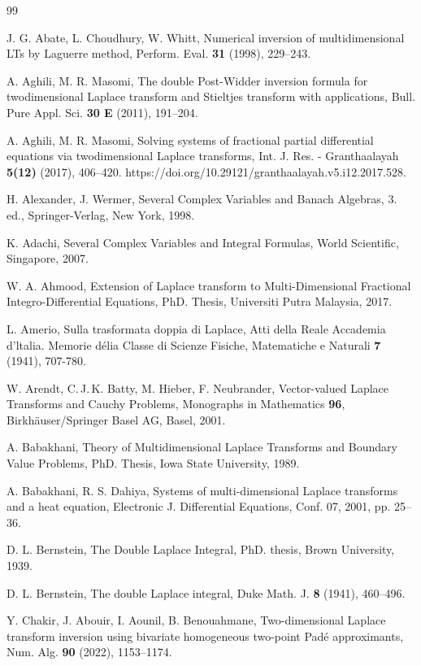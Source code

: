 \documentclass{amsart}
\theoremstyle{definition}
\theoremstyle{remark}
\numberwithin{equation}{section}
\begin{document}
\begin{thebibliography}{99}

 J.
G. Abate, L. Choudhury, W. Whitt, 
Numerical inversion of multidimensional LTs by Laguerre
method,
Perform. Eval. {\bf 31} (1998), 229--243.%

A. Aghili, M. R. Masomi,
The double Post-Widder inversion formula for twodimensional Laplace transform and Stieltjes transform with applications,
Bull. Pure Appl. Sci.
{\bf 30 E} (2011), 191--204.

A. Aghili, M. R. Masomi,
Solving systems of fractional partial differential equations via twodimensional Laplace transforms,
Int. J. Res. - Granthaalayah {\bf 5(12)} (2017), 406--420. https://doi.org/10.29121/granthaalayah.v5.i12.2017.528.

H. Alexander, J. Wermer,
Several Complex Variables and Banach Algebras, 3. ed.,
Springer-Verlag, New York, 1998.

K. Adachi,
Several Complex
Variables and
Integral Formulas,
World Scientific, Singapore, 2007.

W. A. Ahmood,
Extension of Laplace transform to Multi-Dimensional Fractional Integro-Differential Equations,
PhD. Thesis,
Universiti Putra Malaysia, 2017.

L. Amerio, 
Sulla trasformata doppia di Laplace, 
Atti della Reale Accademia d'ltalia.
Memorie délia Classe di Scienze Fisiche, Matematiche e Naturali {\bf 7} (1941), 707-780.

W. Arendt, C.\,J.\,K. Batty, M. Hieber, F. Neubrander,
Vector-valued Laplace Transforms and Cauchy Problems,
Monographs in Mathematics \textbf{96}, Birkh\"auser/Springer Basel AG, Basel,
2001.

A. Babakhani,
Theory of Multidimensional Laplace Transforms and Boundary
Value Problems,
PhD. Thesis, Iowa State University, 1989.

A. Babakhani, R. S. Dahiya,
Systems of multi-dimensional Laplace transforms and a heat equation,
Electronic J. Differential Equations, Conf. 07, 2001, pp. 25--36. 

D. L. Bernstein, 
The Double Laplace Integral,
PhD. thesis, Brown University, 1939. 

D. L. Bernstein, 
The double Laplace integral,
Duke Math. J. {\bf 8} (1941),
460--496.

Y. Chakir, J. Abouir, I. Aounil, B. Benouahmane,
Two-dimensional Laplace transform inversion using
bivariate homogeneous two-point Pad\'e
approximants,
Num. Alg. {\bf 90} (2022), 1153--1174. 


\end{thebibliography}
\end{document}
